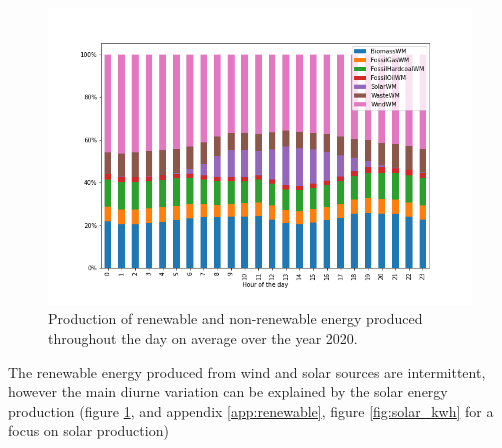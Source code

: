 \documentclass[11pt]{article} %
\begin{document}
\begin{figure}
  \includegraphics[width=0.9\linewidth]{../outputs/generated_energy_precent_per_sources.png}
  \caption{Production of renewable and non-renewable energy produced throughout the day on average over the year 2020.}
  \label{fig:per_source}
\end{figure}

The renewable energy produced from wind and solar sources are intermittent, however the main diurne variation can be explained by the solar energy production (figure \ref{fig:per_source}, and appendix \ref{app:renewable}, figure \ref{fig:solar_kwh} for a focus on solar production)
\end{document}
